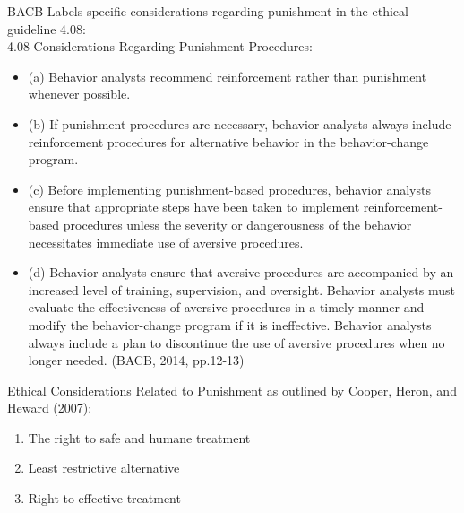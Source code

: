 BACB Labels specific considerations regarding punishment in the ethical guideline 4.08:\\
4.08 Considerations Regarding Punishment Procedures:
\begin{itemize}
\item (a) Behavior analysts recommend reinforcement rather than punishment whenever possible. 
\item (b) If punishment procedures are necessary, behavior analysts always include reinforcement procedures for alternative behavior in the behavior-change program. 
\item (c) Before implementing punishment-based procedures, behavior analysts ensure that appropriate steps  
have been taken to implement reinforcement-based procedures unless the severity or dangerousness of the behavior necessitates immediate use of aversive procedures.
\item (d) Behavior analysts ensure that aversive procedures are accompanied by an increased level of training, supervision, and oversight. Behavior analysts must evaluate the effectiveness of aversive procedures in a timely manner and modify the behavior-change program if it is ineffective. Behavior analysts always include a plan to discontinue the use of aversive procedures when no longer needed. (BACB, 2014, pp.12-13)
\end{itemize}
%
Ethical Considerations Related to Punishment as outlined by Cooper, Heron, and Heward (2007):
\begin{enumerate}
\item The right to safe and humane treatment
\item Least restrictive alternative
\item Right to effective treatment
\end{enumerate}

